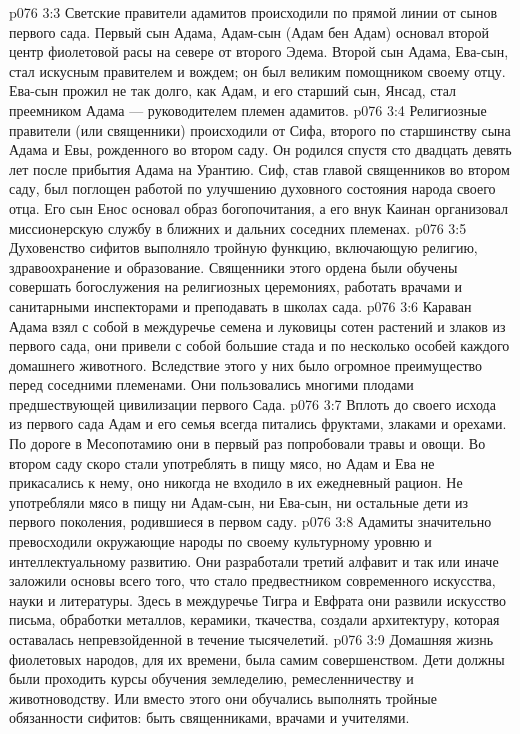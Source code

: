 \vs p076 3:3 \pc Светские правители адамитов происходили по прямой линии от сынов первого сада. Первый сын Адама, Адам\hyp{}сын (Адам бен Адам) основал второй центр фиолетовой расы на севере от второго Эдема. Второй сын Адама, Ева\hyp{}сын, стал искусным правителем и вождем; он был великим помощником своему отцу. Ева\hyp{}сын прожил не так долго, как Адам, и его старший сын, Янсад, стал преемником Адама --- руководителем племен адамитов.
\vs p076 3:4 \pc Религиозные правители (или священники) происходили от Сифа, второго по старшинству сына Адама и Евы, рожденного во втором саду. Он родился спустя сто двадцать девять лет после прибытия Адама на Урантию. Сиф, став главой священников во втором саду, был поглощен работой по улучшению духовного состояния народа своего отца. Его сын Енос основал образ богопочитания, а его внук Каинан организовал миссионерскую службу в ближних и дальних соседних племенах.
\vs p076 3:5 Духовенство сифитов выполняло тройную функцию, включающую религию, здравоохранение и образование. Священники этого ордена были обучены совершать богослужения на религиозных церемониях, работать врачами и санитарными инспекторами и преподавать в школах сада.
\vs p076 3:6 \pc Караван Адама взял с собой в междуречье семена и луковицы сотен растений и злаков из первого сада, они привели с собой большие стада и по несколько особей каждого домашнего животного. Вследствие этого у них было огромное преимущество перед соседними племенами. Они пользовались многими плодами предшествующей цивилизации первого Сада.
\vs p076 3:7 Вплоть до своего исхода из первого сада Адам и его семья всегда питались фруктами, злаками и орехами. По дороге в Месопотамию они в первый раз попробовали травы и овощи. Во втором саду скоро стали употреблять в пищу мясо, но Адам и Ева не прикасались к нему, оно никогда не входило в их ежедневный рацион. Не употребляли мясо в пищу ни Адам\hyp{}сын, ни Ева\hyp{}сын, ни остальные дети из первого поколения, родившиеся в первом саду.
\vs p076 3:8 \pc Адамиты значительно превосходили окружающие народы по своему культурному уровню и интеллектуальному развитию. Они разработали третий алфавит и так или иначе заложили основы всего того, что стало предвестником современного искусства, науки и литературы. Здесь в междуречье Тигра и Евфрата они развили искусство письма, обработки металлов, керамики, ткачества, создали архитектуру, которая оставалась непревзойденной в течение тысячелетий.
\vs p076 3:9 Домашняя жизнь фиолетовых народов, для их времени, была самим совершенством. Дети должны были проходить курсы обучения земледелию, ремесленничеству и животноводству. Или вместо этого они обучались выполнять тройные обязанности сифитов: быть священниками, врачами и учителями.
